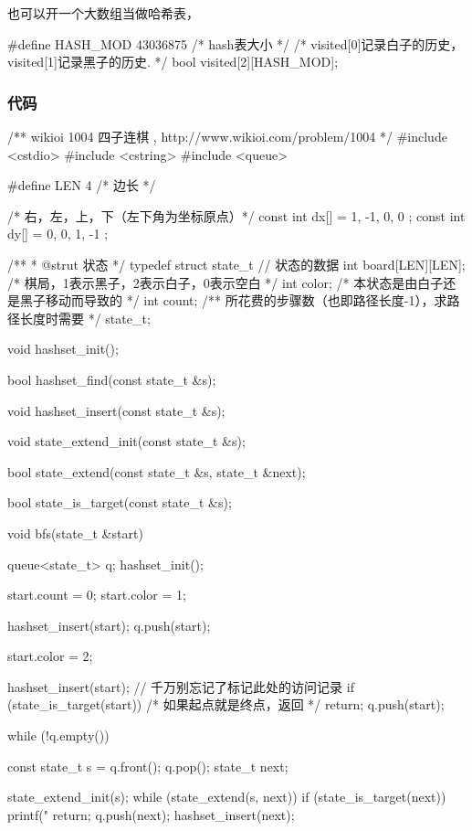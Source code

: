 也可以开一个大数组当做哈希表，
\begin{Code}
#define HASH_MOD 43036875 /* hash表大小 */
/* visited[0]记录白子的历史， visited[1]记录黑子的历史. */
bool visited[2][HASH_MOD];
\end{Code}

\subsubsection{代码}
\begin{Codex}[label=four_adjacent.cpp]
/** wikioi 1004 四子连棋  , http://www.wikioi.com/problem/1004 */
#include <cstdio>
#include <cstring>
#include <queue>

#define LEN 4   /* 边长 */

/* 右，左，上，下（左下角为坐标原点）*/
const int dx[] = { 1, -1, 0, 0 };
const int dy[] = { 0, 0, 1, -1 };


/**
 * @strut 状态
 */
typedef struct state_t {
    // 状态的数据
    int board[LEN][LEN]; /* 棋局，1表示黑子，2表示白子，0表示空白 */
    int color; /* 本状态是由白子还是黑子移动而导致的 */
    int count;  /** 所花费的步骤数（也即路径长度-1），求路径长度时需要 */
} state_t;

void hashset_init();

bool hashset_find(const state_t &s);

void hashset_insert(const state_t &s);

void state_extend_init(const state_t &s);

bool state_extend(const state_t &s, state_t &next);

bool state_is_target(const state_t &s);

void bfs(state_t &start) {
    queue<state_t> q;
    hashset_init();

    start.count = 0;
    start.color = 1;

    hashset_insert(start);
    q.push(start);

    start.color = 2;

    hashset_insert(start); // 千万别忘记了标记此处的访问记录
    if (state_is_target(start)) /* 如果起点就是终点，返回 */
        return;
    q.push(start);

    while (!q.empty()) {
        const state_t s = q.front(); q.pop();
        state_t next;

        state_extend_init(s);
        while (state_extend(s, next)) {
            if (state_is_target(next)) {
                printf("%
                return;
            }
            q.push(next);
            hashset_insert(next);
        }
    }
}


\end{Codex}
